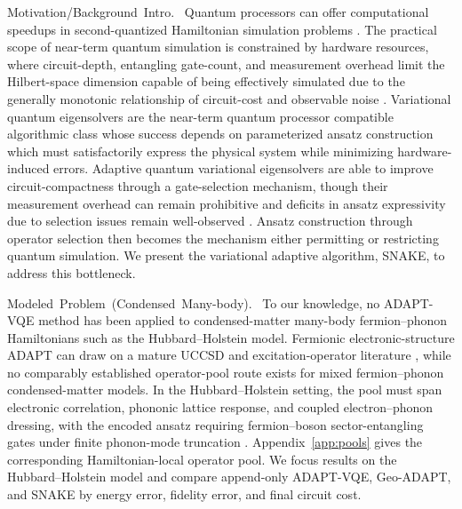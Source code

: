 \documentclass[
  reprint,
  amsmath,
  amssymb,
  aps,
  pra,
  nofootinbib,
  superscriptaddress,
  floatfix
]{revtex4-2}
\newcommand{\tentative}[1]{\textcolor{red!70!black}{#1}}
\newcommand{\structlabel}[1]{\noindent\mbox{\tentative{#1.}}~}
\begin{document}
\structlabel{Motivation/Background Intro}
Quantum processors can offer computational speedups in second-quantized Hamiltonian simulation problems \cite{Lloyd1996,AspuruGuzik2005}. The practical scope of near-term quantum simulation is constrained by hardware resources, where circuit-depth, entangling gate-count, and measurement overhead limit the Hilbert-space dimension capable of being effectively simulated due to the generally monotonic relationship of circuit-cost and observable noise \cite{Preskill2018NISQ,Cerezo2021VQA,Huggins2021Measurements}. Variational quantum eigensolvers are the near-term quantum processor compatible algorithmic class whose success depends on parameterized ansatz construction which must satisfactorily express the physical system while minimizing hardware-induced errors.  Adaptive quantum variational eigensolvers are able to improve circuit-compactness through a gate-selection mechanism, though their measurement overhead can remain prohibitive and deficits in ansatz expressivity due to selection issues remain well-observed \cite{Grimsley2019,Tang2021,Yordanov2021,Feniou2023ADAPT,Ikhtiarudin2025ShotEfficient}.  Ansatz construction through operator selection then becomes the mechanism either permitting or restricting quantum simulation. We present the variational adaptive algorithm, SNAKE, to address this bottleneck.


\structlabel{Modeled Problem (Condensed Many-body)}
To our knowledge, no ADAPT-VQE method has been applied to condensed-matter many-body fermion--phonon Hamiltonians such as the Hubbard--Holstein model. Fermionic electronic-structure ADAPT can draw on a mature UCCSD and excitation-operator literature \cite{Romero2018UCC,Grimsley2019}, while no comparably established operator-pool route exists for mixed fermion--phonon condensed-matter models. In the Hubbard--Holstein setting, the pool must span electronic correlation, phononic lattice response, and coupled electron--phonon dressing, with the encoded ansatz requiring fermion--boson sector-entangling gates under finite phonon-mode truncation \cite{Hubbard1963,Holstein1959a,Holstein1959b}. Appendix~\ref{app:pools} gives the corresponding Hamiltonian-local operator pool. We focus results on the Hubbard--Holstein model and compare append-only ADAPT-VQE, Geo-ADAPT, and SNAKE by energy error, fidelity error, and final circuit cost.
\end{document}
